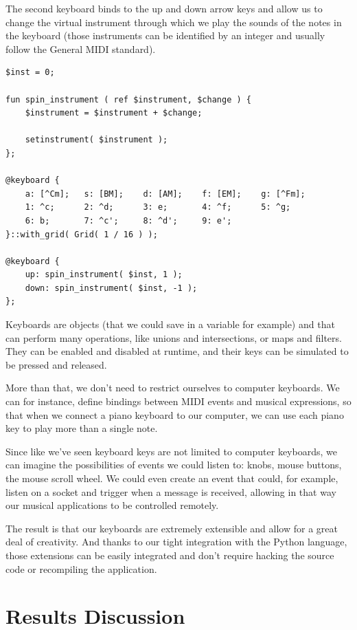 \documentclass[a4paper,UKenglish,cleveref, autoref]{oasics-v2019}
\begin{document}
The second keyboard binds to the up and down arrow keys and allow us to change the virtual instrument through which we play the sounds of the notes in the keyboard (those instruments can be identified by an integer and usually follow the General MIDI standard\cite{GeneralMIDI}).

\begin{lstlisting}[caption={Creating a keyboard that can play multiple instruments},label=list:9,captionpos=t,abovecaptionskip=-\medskipamount]
$inst = 0;

fun spin_instrument ( ref $instrument, $change ) {
    $instrument = $instrument + $change;
    
    setinstrument( $instrument );
};

@keyboard {
    a: [^Cm];   s: [BM];    d: [AM];    f: [EM];    g: [^Fm];
    1: ^c;      2: ^d;      3: e;       4: ^f;      5: ^g;
    6: b;       7: ^c';     8: ^d';     9: e';
}::with_grid( Grid( 1 / 16 ) );

@keyboard {
    up: spin_instrument( $inst, 1 );
    down: spin_instrument( $inst, -1 );
};
\end{lstlisting}

Keyboards are objects (that we could save in a variable for example) and that can perform many operations, like unions and intersections, or maps and filters. They can be enabled and disabled at runtime, and their keys can be simulated to be pressed and released.

More than that, we don't need to restrict ourselves to computer keyboards. We can for instance, define bindings between MIDI events and musical expressions, so that when we connect a piano keyboard to our computer, we can use each piano key to play more than a single note.

Since like we've seen keyboard keys are not limited to computer keyboards, we can imagine the possibilities of events we could listen to: knobs, mouse buttons, the mouse scroll wheel. We could even create an event that could, for example, listen on a socket and trigger when a message is received, allowing in that way our musical applications to be controlled remotely.

The result is that our keyboards are extremely extensible and allow for a great deal of creativity. And thanks to our tight integration with the Python language, those extensions can be easily integrated and don't require hacking the source code or recompiling the application.

\section{Results Discussion}
\label{sec:conclusions}
\end{document}
